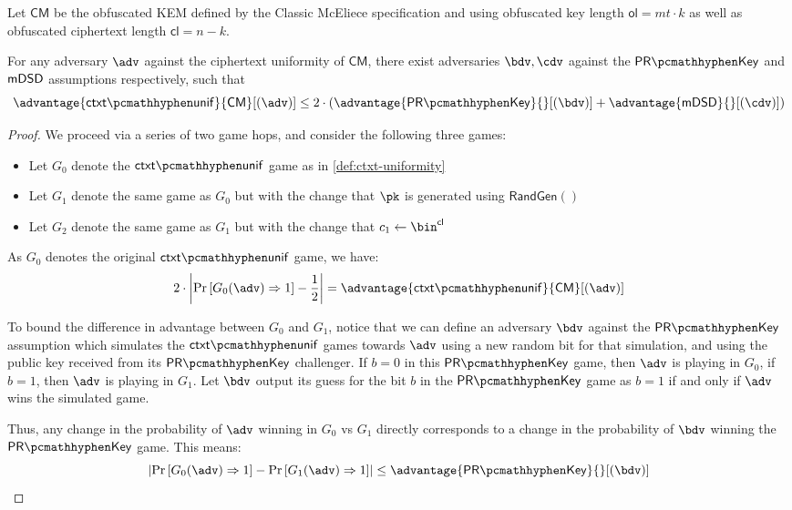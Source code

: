 \begin{lemma} \label{lem:classic-mceliece-ctxt-unif}
    Let $\mathsf{CM}$ be the obfuscated KEM defined by the Classic McEliece specification \cite{NISTPQC-R4:ClassicMcEliece22} and using obfuscated key length $\mathsf{ol} = mt \cdot k$ as well as obfuscated ciphertext length $\mathsf{cl} = n-k$.
    
    For any adversary $\adv$ against the ciphertext uniformity of $\mathsf{CM}$, there exist adversaries $\bdv, \cdv$ against the $\prkey$ and $\mathsf{mDSD}$ assumptions respectively, such that
    \[ \advantage{\ctxtunif}{\mathsf{CM}}[(\adv)] \leq 2 \cdot \left( \advantage{\prkey}{}[(\bdv)] + \advantage{\mdsd}{}[(\cdv)] \right) \]
\end{lemma}
\begin{proof}
    We proceed via a series of two game hops, and consider the following three games:
    \begin{itemize}
        \item Let $G_0$ denote the $\ctxtunif$ game as in \cref{def:ctxt-uniformity}
        \item Let $G_1$ denote the same game as $G_0$ but with the change that $\pk$ is generated using $\textsf{RandGen}()$
        \item Let $G_2$ denote the same game as $G_1$ but with the change that $c_1 \gets \bin^\mathsf{cl}$
    \end{itemize}

    As $G_0$ denotes the original $\ctxtunif$ game, we have:
    \[ 2 \cdot \left| \Pr\left[G_0(\adv) \Rightarrow 1\right] - \frac{1}{2} \right| = \advantage{\ctxtunif}{\mathsf{CM}}[(\adv)] \]

    To bound the difference in advantage between $G_0$ and $G_1$, notice that we can define an adversary $\bdv$ against the $\prkey$ assumption which simulates the $\ctxtunif$ games towards $\adv$ using a new random bit for that simulation, and using the public key received from its $\prkey$ challenger. If $b=0$ in this $\prkey$ game, then $\adv$ is playing in $G_0$, if $b=1$, then $\adv$ is playing in $G_1$. Let $\bdv$ output its guess for the bit $b$ in the $\prkey$ game as $b=1$ if and only if $\adv$ wins the simulated game.

    Thus, any change in the probability of $\adv$ winning in $G_0$ vs $G_1$ directly corresponds to a change in the probability of $\bdv$ winning the $\prkey$ game. This means:
    \[ \left| \Pr\left[G_0(\adv) \Rightarrow 1\right] - \Pr\left[G_1(\adv) \Rightarrow 1\right] \right| \leq \advantage{\prkey}{}[(\bdv)] \]


\end{proof}
